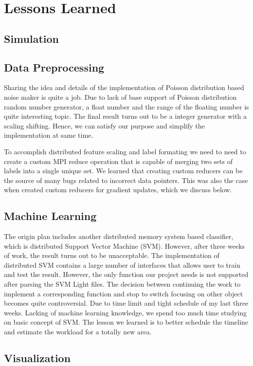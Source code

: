 \section{Lessons Learned}
\label{lessons}

\subsection{Simulation}


\subsection{Data Preprocessing}

Sharing the idea and details of the implementation of Poisson distribution based noise maker is quite a job. Due to lack of base support of Poisson distribution random number generator, a float number and the range of the floating number is quite interesting topic. The final result turns out to be a integer generator with a scaling shifting. Hence, we can satisfy our purpose and simplify the implementation at same time.

To accomplish distributed feature scaling and label formating we need to need to create a custom MPI reduce operation that is capable of merging two sets of labels into a single unique set.  We learned that creating custom reducers can be the source of many bugs related to incorrect data pointers.  This was also the case when created custom reducers for gradient updates, which we discuss below.

\subsection{Machine Learning}

The origin plan includes another distributed memory system based classifier, which is distributed Support Vector Machine (SVM). However, after three weeks of work, the result turns out to be unacceptable. The implementation of distributed SVM contains a large number of interfaces that allows user to train and test the result. However, the only function our project needs is not supported after parsing the SVM Light files. The decision between continuing the work to implement a corresponding function and stop to switch focusing on other object becomes quite controversial. Due to time limit and tight schedule of my last three weeks. Lacking of machine learning knowledge, we spend too much time studying on basic concept of SVM. The lesson we learned is to better schedule the timeline and estimate the workload for a totally new area.



\subsection{Visualization}
